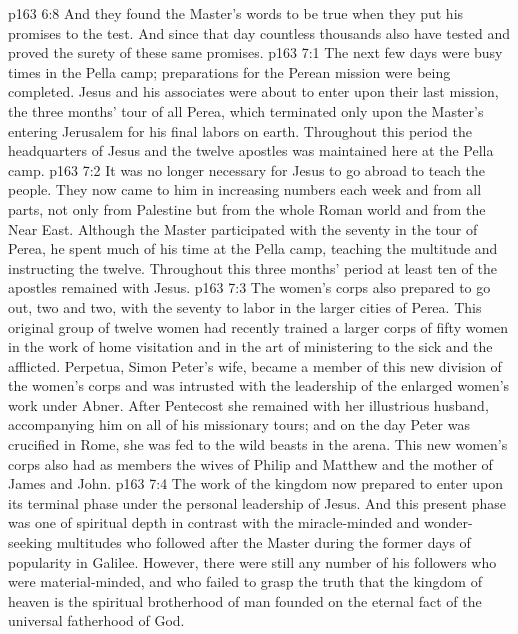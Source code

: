 \pc \vs p163 6:8 And they found the Master’s words to be true when they put his promises to the test. And since that day countless thousands also have tested and proved the surety of these same promises.
\vs p163 7:1 The next few days were busy times in the Pella camp; preparations for the Perean mission were being completed. Jesus and his associates were about to enter upon their last mission, the three months’ tour of all Perea, which terminated only upon the Master’s entering Jerusalem for his final labors on earth. Throughout this period the headquarters of Jesus and the twelve apostles was maintained here at the Pella camp.
\vs p163 7:2 It was no longer necessary for Jesus to go abroad to teach the people. They now came to him in increasing numbers each week and from all parts, not only from Palestine but from the whole Roman world and from the Near East. Although the Master participated with the seventy in the tour of Perea, he spent much of his time at the Pella camp, teaching the multitude and instructing the twelve. Throughout this three months’ period at least ten of the apostles remained with Jesus.
\vs p163 7:3 The women’s corps also prepared to go out, two and two, with the seventy to labor in the larger cities of Perea. This original group of twelve women had recently trained a larger corps of fifty women in the work of home visitation and in the art of ministering to the sick and the afflicted. Perpetua, Simon Peter’s wife, became a member of this new division of the women’s corps and was intrusted with the leadership of the enlarged women’s work under Abner. After Pentecost she remained with her illustrious husband, accompanying him on all of his missionary tours; and on the day Peter was crucified in Rome, she was fed to the wild beasts in the arena. This new women’s corps also had as members the wives of Philip and Matthew and the mother of James and John.
\vs p163 7:4 The work of the kingdom now prepared to enter upon its terminal phase under the personal leadership of Jesus. And this present phase was one of spiritual depth in contrast with the miracle\hyp{}minded and wonder\hyp{}seeking multitudes who followed after the Master during the former days of popularity in Galilee. However, there were still any number of his followers who were material\hyp{}minded, and who failed to grasp the truth that the kingdom of heaven is the spiritual brotherhood of man founded on the eternal fact of the universal fatherhood of God.

